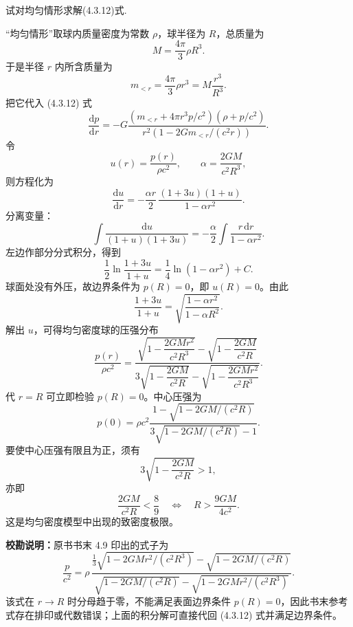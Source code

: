 \begin{exercise}\label{ex:4.9}
试对均匀情形求解(4.3.12)式.
\end{exercise}
\begin{solution}
“均匀情形”取球内质量密度为常数 $\rho$，球半径为 $R$，总质量为
$$
M=\frac{4\pi}{3}\rho R^3.
$$
于是半径 $r$ 内所含质量为
$$
m_{<r}=\frac{4\pi}{3}\rho r^3=M\frac{r^3}{R^3}.
$$
把它代入 (4.3.12) 式
$$
\frac{\mathrm{d}p}{\mathrm{d}r}
=-G\frac{\left(m_{<r}+4\pi r^3p/c^2\right)\left(\rho+p/c^2\right)}
{r^2\left(1-2Gm_{<r}/(c^2r)\right)}.
$$
令
$$
u(r)=\frac{p(r)}{\rho c^2},\qquad
\alpha=\frac{2GM}{c^2R^3},
$$
则方程化为
$$
\frac{\mathrm{d}u}{\mathrm{d}r}
=-\frac{\alpha r}{2}\,
\frac{(1+3u)(1+u)}{1-\alpha r^2}.
$$
分离变量：
$$
\int\frac{\mathrm{d}u}{(1+u)(1+3u)}
=-\frac{\alpha}{2}\int\frac{r\,\mathrm{d}r}{1-\alpha r^2}.
$$
左边作部分分式积分，得到
$$
\frac12\ln\frac{1+3u}{1+u}
=\frac14\ln(1-\alpha r^2)+C.
$$
球面处没有外压，故边界条件为 $p(R)=0$，即 $u(R)=0$。由此
$$
\frac{1+3u}{1+u}
=\sqrt{\frac{1-\alpha r^2}{1-\alpha R^2}}.
$$
解出 $u$，可得均匀密度球的压强分布
$$
\boxed{\displaystyle
\frac{p(r)}{\rho c^2}
=
\frac{
\sqrt{1-\dfrac{2GMr^2}{c^2R^3}}
-
\sqrt{1-\dfrac{2GM}{c^2R}}
}{
3\sqrt{1-\dfrac{2GM}{c^2R}}
-
\sqrt{1-\dfrac{2GMr^2}{c^2R^3}}
}}.
$$
代 $r=R$ 可立即检验 $p(R)=0$。中心压强为
$$
\boxed{\displaystyle
p(0)=\rho c^2
\frac{1-\sqrt{1-2GM/(c^2R)}}
{3\sqrt{1-2GM/(c^2R)}-1}}.
$$
要使中心压强有限且为正，须有
$$
3\sqrt{1-\frac{2GM}{c^2R}}>1,
$$
亦即
$$
\boxed{\displaystyle \frac{2GM}{c^2R}<\frac89
\quad\Longleftrightarrow\quad
R>\frac{9GM}{4c^2}}.
$$
这是均匀密度模型中出现的致密度极限。

\textbf{校勘说明：}原书书末 4.9 印出的式子为
$$
\frac{p}{c^2}=\rho\,
\frac{\frac13\sqrt{1-2GMr^2/(c^2R^3)}-\sqrt{1-2GM/(c^2R)}}
{\sqrt{1-2GM/(c^2R)}-\sqrt{1-2GMr^2/(c^2R^3)}}.
$$
该式在 $r\to R$ 时分母趋于零，不能满足表面边界条件 $p(R)=0$，因此书末参考式存在排印或代数错误；上面的积分解可直接代回 (4.3.12) 式并满足边界条件。
\end{solution}


